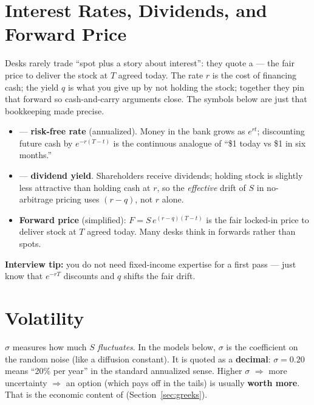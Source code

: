 \section{Interest Rates, Dividends, and Forward Price}
\label{sec:plain-rates-divs}
Desks rarely trade ``spot plus a story about interest'': they quote a 
 --- the fair price to deliver the stock at $T$ agreed today. 
The rate $r$ is the cost of financing cash; the yield $q$ is what you give up by 
not holding the stock; together they pin that forward so cash-and-carry arguments 
close. The symbols below are just that bookkeeping made precise.
\begin{itemize}
    \item {} --- \textbf{risk-free rate} (annualized). Money in the bank grows 
          as $e^{rt}$; discounting future cash by $e^{-r(T-t)}$ is the continuous analogue 
          of ``\$1 today vs \$1 in six months.''
    \item {} --- \textbf{dividend yield}. Shareholders receive dividends; 
          holding stock is slightly less attractive than holding cash at $r$, so the 
          \emph{effective} drift of $S$ in no-arbitrage pricing uses $(r - q)$, not $r$ alone.
    \item \textbf{Forward price} (simplified): 
          $F = S\,e^{(r-q)(T-t)}$ is the fair locked-in price to deliver stock at $T$ 
          agreed today. Many desks think in forwards rather than spots.
\end{itemize}
\par\noindent\textbf{Interview tip:} you do not need fixed-income expertise for a first pass --- just know that 
$e^{-rT}$ discounts and $q$ shifts the fair drift.

\section{Volatility}
\label{sec:plain-volatility}
 $\sigma$ measures how much $S$ \emph{fluctuates}. In the models below, 
$\sigma$ is the coefficient on the random noise (like a diffusion constant). 
It is quoted as a \textbf{decimal}: $\sigma = 0.20$ means ``20\% per year'' in the 
standard annualized sense.
\newline
Higher $\sigma$ $\Rightarrow$ more uncertainty $\Rightarrow$ an option (which pays off 
in the tails) is usually \textbf{worth more}. That is the economic content of  
(Section~\ref{sec:greeks}).

